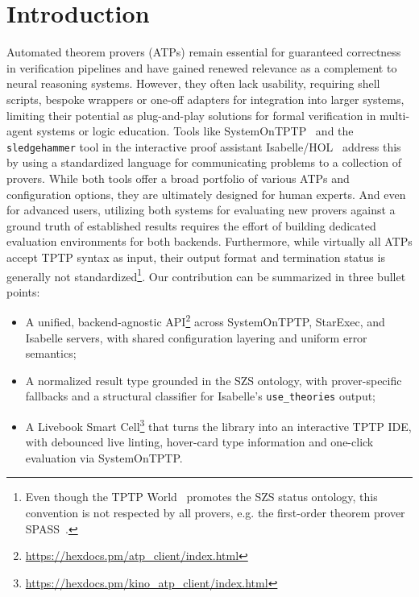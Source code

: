 \documentclass[]{ceurart}
\begin{document}
\maketitle

\section{Introduction}

Automated theorem provers (ATPs) remain essential for guaranteed correctness in verification pipelines and have gained renewed relevance as a complement to neural reasoning systems. However, they often lack usability, requiring shell scripts, bespoke wrappers or one-off adapters for integration into larger systems, limiting their potential as plug-and-play solutions for formal verification in multi-agent systems or logic education. Tools like SystemOnTPTP~\citep{sutcliffe2000sotptp} and the \texttt{sledgehammer} tool in the interactive proof assistant Isabelle/HOL~\citep{nipkow2002isabelle} address this by using a standardized language for communicating problems to a collection of provers. While both tools offer a broad portfolio of various ATPs and configuration options, they are ultimately designed for human experts. And even for advanced users, utilizing both systems for evaluating new provers against a ground truth of established results requires the effort of building dedicated evaluation environments for both backends. Furthermore, while virtually all ATPs accept TPTP syntax as input, their output format and termination status is generally not standardized\footnote{Even though the TPTP World~\citep{sutcliffe2024tptpworld} promotes the SZS status ontology, this convention is not respected by all provers, e.g. the first-order theorem prover SPASS~\citep{weidenbach2009spass}.}. Our contribution can be summarized in three bullet points:

\begin{itemize}
    \item A unified, backend-agnostic API\footnote{\url{https://hexdocs.pm/atp_client/index.html}} across SystemOnTPTP, StarExec, and Isabelle servers, with shared configuration layering and uniform error semantics;
    \item A normalized result type grounded in the SZS ontology, with prover-specific fallbacks and a structural classifier for Isabelle's \texttt{use\_theories} output;
    \item A Livebook Smart Cell\footnote{\url{https://hexdocs.pm/kino_atp_client/index.html}} that turns the library into an interactive TPTP IDE, with debounced live linting, hover-card type information and one-click evaluation via SystemOnTPTP.
\end{itemize}
\end{document}
